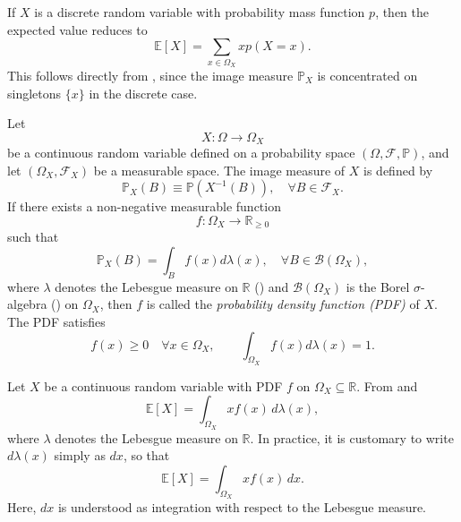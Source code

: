\begin{remark}
	\label{rem:expected_value_discrete}
	If $X$ is a discrete random variable with probability mass function $p$, then the expected value reduces to
	\begin{equation}
		\mathbb{E}[X]=\sum_{x\in \Omega_X} x p(X = x).
	\end{equation}
	This follows directly from , since the image measure $\mathbb{P}_X$ is concentrated on singletons $\{x\}$ in the discrete case.
\end{remark}

\begin{definition}
	\label{def:pdf}
	Let 
	\begin{equation}
		X: \Omega \to \Omega_X
	\end{equation} 
	be a continuous random variable defined on a probability space $(\Omega, \mathcal{F}, \mathbb{P})$, and let $(\Omega_X, \mathcal{F}_X)$ be a measurable space. The image measure of $X$ is defined by
	\begin{equation}
		\mathbb{P}_X(B) \equiv \mathbb{P}(X^{-1}(B)), \quad \forall B \in \mathcal{F}_X.
	\end{equation}
	If there exists a non-negative measurable function
	\begin{equation}
		f: \Omega_X \to \mathbb{R}_{\ge 0}
	\end{equation} 
	such that
	\begin{equation}
		\mathbb{P}_X(B) = \int_B f(x) d\lambda(x), \quad \forall B \in \mathcal{B}(\Omega_X),
	\end{equation}
	where $\lambda$ denotes the Lebesgue measure on $\mathbb{R}$ () and $\mathcal{B}(\Omega_X)$ is the Borel $\sigma$-algebra () on $\Omega_X$, then $f$ is called the \emph{probability density function (PDF)} of $X$. The PDF satisfies
	\begin{equation}
		f(x) \ge 0 \quad \forall x \in \Omega_X, \qquad 
		\int_{\Omega_X} f(x) d\lambda(x) = 1.
	\end{equation}
\end{definition}

\begin{remark}
	\label{remark:expectation_continuous}
	Let $X$ be a continuous random variable with PDF $f$ on $\Omega_X \subseteq \mathbb{R}$. From  and 	
	\begin{equation}
		\mathbb{E}[X] = \int_{\Omega_X} x f(x) \, d\lambda(x),
	\end{equation}
	where $\lambda$ denotes the Lebesgue measure on $\mathbb{R}$. 
	In practice, it is customary to write $d\lambda(x)$ simply as $dx$, so that
	\begin{equation}
		\mathbb{E}[X] = \int_{\Omega_X} x f(x) \, dx.
	\end{equation}
	Here, $dx$ is understood as integration with respect to the Lebesgue measure.
\end{remark}



